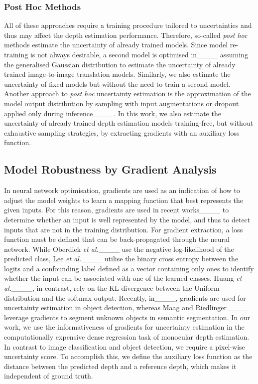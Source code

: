 \subsubsection{Post Hoc Methods}
All of these approaches require a training procedure tailored to uncertainties and thus may affect the depth estimation performance. Therefore, so-called \textit{post hoc} methods estimate the uncertainty of already trained models. Since model re-training is not always desirable, a second model is optimised in____ assuming the generalised Gaussian distribution to estimate the uncertainty of already trained image-to-image translation models. Similarly, we also estimate the uncertainty of fixed models but without the need to train a second model. Another approach to \textit{post hoc} uncertainty estimation is the approximation of the model output distribution by sampling with input augmentations or dropout applied only during inference____. In this work, we also estimate the uncertainty of already trained depth estimation models training-free, but without exhaustive sampling strategies, by extracting gradients with an auxiliary loss function. 

\subsection{Model Robustness by Gradient Analysis}
In neural network optimisation, gradients are used as an indication of how to adjust the model weights to learn a mapping function that best represents the given inputs. For this reason, gradients are used in recent works____ to determine whether an input is well represented by the model, and thus to detect inputs that are not in the training distribution. For gradient extraction, a loss function must be defined that can be back-propagated through the neural network. While Oberdiek \textit{et al.}____ use the negative log-likelihood of the predicted class, Lee \textit{et al.}____ utilise the binary cross entropy between the logits and a confounding label defined as a vector containing only ones to identify whether the input can be associated with one of the learned classes. Huang \textit{et al.}____, in contrast, rely on the KL divergence between the Uniform distribution and the softmax output. Recently, in____, gradients are used for uncertainty estimation in object detection, whereas Maag and Riedlinger____ leverage gradients to segment unknown objects in semantic segmentation. In our work, we use the informativeness of gradients for uncertainty estimation in the computationally expensive dense regression task of monocular depth estimation. In contrast to image classification and object detection, we require a pixel-wise uncertainty score. To accomplish this, we define the auxiliary loss function as the distance between the predicted depth and a reference depth, which makes it independent of ground truth.  


